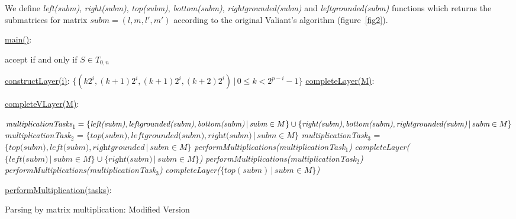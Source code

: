 We define \textit{left(subm)}, \textit{right(subm)}, \textit{top(subm)}, \textit{bottom(subm)}, \textit{rightgrounded(subm)} and \textit{leftgrounded(subm)} functions which returns the submatrices for matrix $\textit{subm} = (l, m, l', m')$ according to the original Valiant's algorithm (figure~\ref{fig2}).


\begin{algorithm}[!h]
\SetAlgoNoLine
{}
\underline{main()}{:}{

 accept if and only if $S \in T_{0, n}$
 \BlankLine
 }

\underline{constructLayer(i)}{:}{
 \BlankLine
 $\{(k2^i, (k+1)2^i, (k + 1)2^i, (k+2)2^i) \, |\, 0 \le k < 2^{p - i} - 1\}$
 \BlankLine
    }
\underline{completeLayer(M)}{:}{
\BlankLine
{}
\BlankLine
}

\underline{completeVLayer(M)}{:}{
 \BlankLine
 $\textit{multiplicationTasks}_1 = \linebreak
    \{\textit{left(subm)}, \textit{leftgrounded(subm)}, \textit{bottom(subm)}\, 
    |\,\textit{subm} \in M \} \cup \linebreak  \{\textit{right(subm)}, \textit{bottom(subm)}, \textit{rightgrounded(subm)}\, |\,\textit{subm} \in M\}$\;
 \BlankLine
 \textit{multiplicationTask$_2$} = $\{\textit{top(subm)}, \textit{leftgrounded(subm)}, \textit{right(subm)}\, |\,\textit{subm} \in M\}$\;
 \BlankLine
 \textit{multiplicationTask$_3$} = $\{\textit{top(subm)}, \textit{left(subm)}, \textit{rightgrounded}\, |\,\textit{subm} \in M\}$\;
 \BlankLine
 \textit{performMultiplications(multiplicationTask$_1$)}\;
 \textit{completeLayer($\{\textit{left(subm)}\, |\,subm \in M \} \cup \{\textit{right(subm)}\, |\,\textit{subm} \in M \}$)}\;
 \textit{performMultiplications(multiplicationTask$_2$)}\;
 \textit{performMultiplications(multiplicationTask$_3$)}\;
 \textit{completeLayer($\{top(subm)\, |\,subm \in M \}$)}

 }
 \BlankLine

 \underline{performMultiplication(tasks)}{:}{\\
 }

\caption{Parsing by matrix multiplication: Modified Version}
\label{algo:modified}
\end{algorithm}


